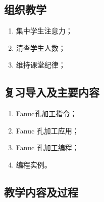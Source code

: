 \jxhj{%
	}

\makeshouye %

\subsection{组织教学}
\begin{enumerate}[\hspace{2em}1、]
	\item 集中学生注意力；
	\item 清查学生人数；
	\item 维持课堂纪律；
\end{enumerate}

\subsection{复习导入及主要内容}
\begin{enumerate}[1、]
\item Fanuc孔加工指令；
\item Fanuc 孔加工应用；
\item Fanuc 孔加工编程；
\item 编程实例。
\end{enumerate}

\subsection{教学内容及过程}
